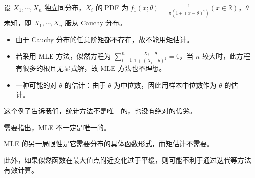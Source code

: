 \documentclass[../main.tex]{subfiles}
\begin{document}
\begin{example}
    设 $X_1,\cdots,X_n$ 独立同分布，$X_i$ 的 PDF 为 $f_1(x;\theta)=\frac1{\pi(1+(x-\theta)^2)}(x\in\mathbb R)$，$\theta$ 未知，即 $X_1,\cdots,X_n$ 服从 Cauchy 分布。
    \begin{itemize}
        \item 由于 Cauchy 分布的任意阶矩都不存在，故不能用矩估计。
        \item 若采用 MLE 方法，似然方程为 $\sum_{i=1}^{n}\frac{X_i-\theta}{1+(X_i-\theta)^2}=0$，当 $n$ 较大时，此方程有很多的根且无显式解，故 MLE 方法也不理想。
        \item 一种可能的对 $\theta$ 的估计：由于 $\theta$ 为中位数，因此用样本中位数作为 $\theta$ 的估计。
    \end{itemize}
\end{example}

这个例子告诉我们，统计方法不是唯一的，也没有绝对的优劣。

需要指出，MLE 不一定是唯一的。

MLE 的另一局限性是它需要分布的具体函数形式，而矩估计不需要。

此外，如果似然函数在最大值点附近变化过于平缓，则可能不利于通过迭代等方法有效计算。
\end{document}
